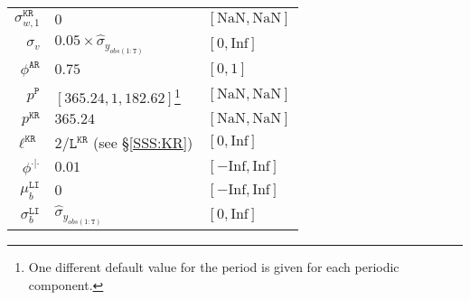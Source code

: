 \begin{table}[h!]
\begin{tabular}{r|ll}
$\sigma_{w,1}^{\mathtt{KR}}  $ &  $0$  &  $[\text{NaN},\text{NaN}]$ \\
$\sigma_{v}$ &  $0.05\times\hat{\sigma}_{y_{obs(1:\mathtt{T})}}$  &  $[0,\text{Inf}]$ \\
$\phi^{\mathtt{AR}} $ &  $0.75$ & $[0,1]$ \\
$p^{\mathtt{P}} $ &  $[365.24, 1, 182.62]$\footnote{One different default value for the period is given for each periodic component.} & $[\text{NaN},\text{NaN}]$ \\
$p^{\mathtt{KR}} $ &  $365.24$ & $[\text{NaN},\text{NaN}]$ \\
$\ell^{\mathtt{KR}} $ &  $2/\mathtt{L}^{\mathtt{KR}}$ (see \S\ref{SSS:KR})& $[0,\text{Inf}]$ \\
$\phi^{\cdot|\cdot} $ &  $0.01$  &  $[-\text{Inf}, \text{Inf}]$\\
$\mu_{b}^{\mathtt{LI}}$ &  $0$  &  $[-\text{Inf}, \text{Inf}]$\\
$\sigma_{b}^{\mathtt{LI}}$ &  $\hat{\sigma}_{y_{obs(1:\mathtt{T})}}$  &  $[0, \text{Inf}]$\\\bottomrule

\end{tabular}
\label{table:defaultparamreal}
\end{table}




